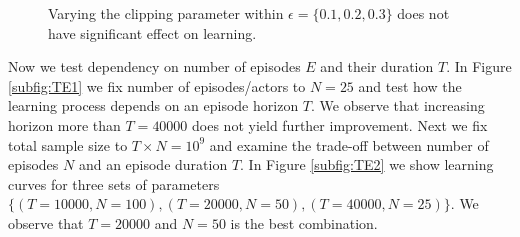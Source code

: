 \documentclass[11pt]{article}
\theoremstyle{definition}
\numberwithin{equation}{section}
\begin{document}
   \begin{figure}[!ht]
     \hfill
     \caption{ Varying the clipping parameter within $\epsilon = \{0.1, 0.2, 0.3\}$ does not have  significant effect on learning.}
     \label{fig:clip}
   \end{figure}




Now we test dependency on number of episodes $E$ and their duration $T$. In Figure \ref{subfig:TE1} we fix number of episodes/actors to $N=25$ and test how the learning process depends on an episode horizon $T$. We observe that increasing horizon more than $T=40000$ does not yield further improvement. Next we fix total sample size to $T\times N = 10^9$ and examine the trade-off between number of episodes $N$ and an episode duration $T$.    In Figure \ref{subfig:TE2} we show learning curves for three sets of parameters $\{(T=10000, N=100), (T=20000, N=50), (T=40000, N=25)\}$. We observe that $ T=20000$ and $N=50$ is the best combination.
\end{document}
